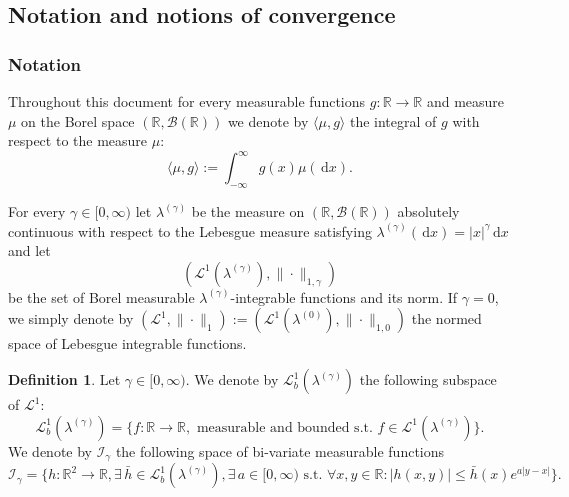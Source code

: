 \documentclass[12pt]{article}
\numberwithin{equation}{section}
\theoremstyle{definition}
\newtheorem{definition}{Definition}
\theoremstyle{remark}
\newcommand{\RR}{\mathbb{R}}
\newcommand{\vd}{\,\mathrm{d}}
\newcommand{\Lone}{\mathcal{L}^1}
\newcommand{\Loneg}[1]{\mathcal{L}^1(\lambda^{(#1)})}
\newcommand{\Lgb}[1]{\mathcal{L}^{1}_{b}(\lambda^{(#1)})}
\newcommand{\Lg}[1]{\mathcal{I}_{#1}}
\begin{document}
\subsection{Notation and notions of convergence} \label{sec:notion}

\subsubsection{Notation}
Throughout this document for every measurable functions $g\colon \RR \to \RR$ and measure $\mu$ on the Borel space $(\RR, \mathcal{B}(\RR))$ we denote by $\langle \mu , g \rangle$ the integral of $g$ with respect to the measure $\mu$:
\begin{equation}\langle \mu , g \rangle := \int_{-\infty}^{\infty} g(x) \mu(\!\vd x).\end{equation}

For every $\gamma \in [0,\infty)$ let 
$\lambda^{(\gamma)}$ be the measure on $(\RR, \mathcal{B}(\RR))$ absolutely continuous with respect to the Lebesgue measure satisfying 
${\lambda^{(\gamma)}(\vd x)} = |x|^\gamma \vd x$
and
let 
\begin{equation}( \Loneg{\gamma}, \|\cdot \|_{1,\gamma} )\end{equation} 
be the set of Borel measurable $\lambda^{(\gamma)}$-integrable functions and its norm.
If $\gamma=0$, we simply denote by $( \Lone, \|\cdot \|_1):=( \Loneg{0}, \|\cdot \|_{1,0})$ the normed space of Lebesgue integrable functions.

\begin{definition} \label{def:integral:gamma}
Let $\gamma \in [0,\infty)$. 
We denote by $\Lgb{\gamma}$ the following subspace of $\Lone$:
\begin{equation}
	\Lgb{\gamma} 
	= \{ f \colon \RR \to \RR , \text{ measurable and bounded} %
	\text{ s.t. } f\in \Loneg{\gamma}\}.
\end{equation}
We denote by $\Lg{\gamma}$ the following space of bi-variate measurable functions
\begin{equation}
	\Lg{\gamma} = \{ h \colon \RR^2 \to \RR , \exists \, \bar h \in \Lgb{\gamma}, \exists \, a\in [0,\infty) \text{ s.t. } \forall x,y\in \RR : |h(x,y)|\leq \bar h (x) e^{a |y-x|} \}.
\end{equation}
\end{definition}
\end{document}
